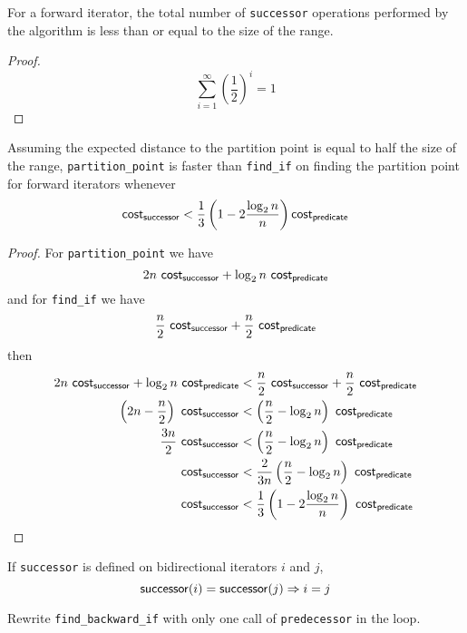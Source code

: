 

\begin{lemma}
	For a forward iterator, the total number of \verb|successor| operations
	performed by the algorithm is less than or equal to the size of the range.
\end{lemma}

\begin{proof}
	\[ \sum_{i=1}^{\infty}{\left ( \frac{1}{2} \right )^i} = 1 \]
\end{proof}

\begin{lemma}
	Assuming the expected distance to the partition point is equal to half the
	size of the range, \verb|partition_point| is faster than \verb|find_if| on
	finding the partition point for forward iterators whenever
	\[ \mathsf{cost}_{\mathsf{successor}} < \frac{1}{3} \left(1 - 2\frac{\log_2n}{n}\right) \mathsf{cost}_{\mathsf{predicate}} \]
\end{lemma}

\begin{proof}
	For \verb|partition_point| we have
	\[ 2n\ \func{cost}_{\func{successor}} + \log_2{n}\ \func{cost}_{\func{predicate}} \]
	and for \verb|find_if| we have
	\[ \frac{n}{2}\ \func{cost}_{\func{successor}} + \frac{n}{2}\ \func{cost}_{\func{predicate}} \]
	then
	\begin{align*}
		2n\ \func{cost}_{\func{successor}} + \log_2{n}\ \func{cost}_{\func{predicate}}
		&< \frac{n}{2}\ \func{cost}_{\func{successor}} + \frac{n}{2}\ \func{cost}_{\func{predicate}}\\
		\left(2n - \frac{n}{2}\right)\ \func{cost}_{\func{successor}}
		&< \left(\frac{n}{2} - \log_2n\right)\ \func{cost}_{\func{predicate}}\\
		\frac{3n}{2}\ \func{cost}_{\func{successor}}
		&< \left(\frac{n}{2} - \log_2n\right)\ \func{cost}_{\func{predicate}}\\
		\func{cost}_{\func{successor}}
		&< \frac{2}{3n}\left(\frac{n}{2} - \log_2n\right)\ \func{cost}_{\func{predicate}}\\
		\func{cost}_{\func{successor}}
		&< \frac{1}{3}\left(1 - 2\frac{\log_2n}{n}\right)\ \func{cost}_{\func{predicate}}
	\end{align*}
\end{proof}

\begin{lemma}
	If \verb|successor| is defined on bidirectional iterators $i$ and $j$,
	\[ \mathsf{successor}(i) = \mathsf{successor}(j) \Rightarrow i = j \]
\end{lemma}

\begin{exercise}
	Rewrite \verb|find_backward_if| with only one call of \verb|predecessor| in the loop.
\end{exercise}


